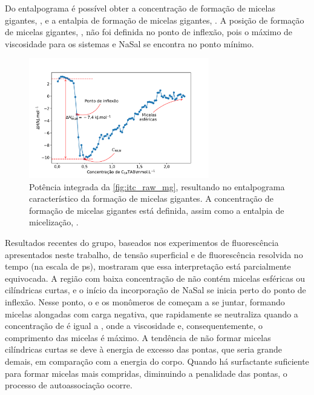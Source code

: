 		Do entalpograma é possível obter a concentração de formação de micelas gigantes, \cwlm, e a entalpia de formação de micelas gigantes, \DHwlm. A posição de formação de micelas gigantes, \cwlm, não foi definida no ponto de inflexão, pois o máximo de viscosidade para os sistemas \TTAB{} e NaSal se encontra no ponto mínimo. \cite{Ito2015c}
		
		\begin{figure}[h]
			\centering
			\includegraphics[width=0.7\textwidth]{imagens/itc/exemplo_integrado_mg}
			\caption{Potência integrada da \autoref{fig:itc_raw_mg}, resultando no entalpograma característico da formação de micelas gigantes. A concentração de formação de micelas gigantes \cwlm{} está definida, assim como a entalpia de micelização, \DHwlm.}
			\label{fig:itc_integrado_mg}
		\end{figure}
		
		Resultados recentes do grupo, baseados nos experimentos de fluorescência apresentados neste trabalho, de tensão superficial e de fluorescência resolvida no tempo (na escala de ps), mostraram que essa interpretação está parcialmente equivocada. A região com baixa concentração de \TTAB{} não contém micelas esféricas ou cilíndricas curtas, e o início da incorporação de NaSal se inicia perto do ponto de inflexão. Nesse ponto, o \Sal{} e os monômeros de \TTAB{} começam a se juntar, formando micelas alongadas com carga negativa, que rapidamente se neutraliza quando a concentração de \TTAB{} é igual a \cwlm, onde a viscosidade e, consequentemente, o comprimento das micelas é máximo. A tendência de não formar micelas cilíndricas curtas se deve à energia de excesso das pontas, que seria grande demais, em comparação com a energia do corpo. Quando há surfactante suficiente para formar micelas mais compridas, diminuindo a penalidade das pontas, o processo de autoassociação ocorre. %
		
